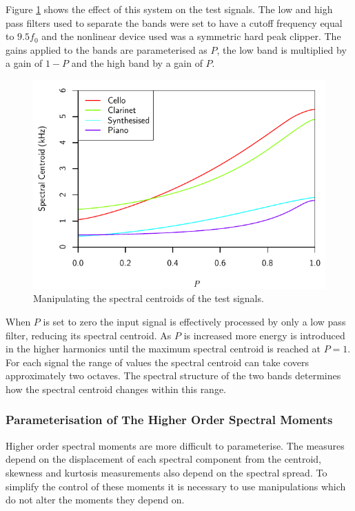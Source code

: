 			Figure \ref{fig:MoveCentroids} shows the effect of this system on the test signals. The low and
			high pass filters used to separate the bands were set to have a cutoff frequency equal to
			$9.5f_{0}$ and the nonlinear device used was a symmetric hard peak clipper. The gains applied to
			the bands are parameterised as $P$, the low band is multiplied by a gain of $1 - P$ and the high
			band by a gain of $P$.

			\begin{figure}[h!]
				\centering
				\includegraphics{chapter6/Images/MoveCentroids.pdf}
				\caption{Manipulating the spectral centroids of the test signals.}
				\label{fig:MoveCentroids}
			\end{figure}

			When $P$ is set to zero the input signal is effectively processed by only a low pass filter,
			reducing its spectral centroid. As $P$ is increased more energy is introduced in the higher
			harmonics until the maximum spectral centroid is reached at $P = 1$. For each signal the range of
			values the spectral centroid can take covers approximately two octaves. The spectral structure of
			the two bands determines how the spectral centroid changes within this range.

		\subsubsection*{Parameterisation of The Higher Order Spectral Moments}
			Higher order spectral moments are more difficult to parameterise. The measures depend on the
			displacement of each spectral component from the centroid, skewness and kurtosis measurements also
			depend on the spectral spread. To simplify the control of these moments it is necessary to use
			manipulations which do not alter the moments they depend on. 
			
